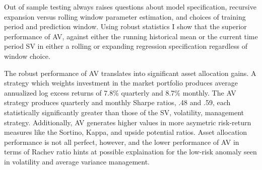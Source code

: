 Out of sample testing always raises questions about model specification, recursive expansion versus rolling window parameter estimation, and choices of training period and prediction window. Using \citet{rossi_out--sample_2012} robust statistics I show that the superior performance of AV, against either the running historical mean or the current time period SV in either a rolling or expanding regression specification regardless of window choice. 

The robust performance of AV translates into significant asset allocation gains. A strategy which weights investment in the market portfolio produces average annualized log excess returns of 7.8\% quarterly and 8.7\% monthly. The AV strategy produces quarterly and monthly Sharpe ratios, .48 and .59, each statistically significantly greater than those of the SV, volatility, management strategy. Additionally, AV generates higher values in more asymetric risk-return measures like the Sortino, Kappa, and upside potential ratios. Asset allocation performance is not all perfect, however, and the lower performance of AV in terms of Rachev ratio hints at possible explaination for the low-risk anomaly seen in volatility and average variance management. 

